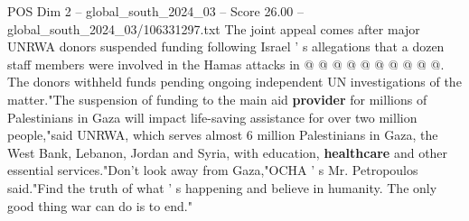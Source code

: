 \begin{textsample}{POS Dim 2 – global\_south\_2024\_03 – Score 26.00 – global\_south\_2024\_03/106331297.txt}
The joint appeal comes after major UNRWA donors suspended funding following Israel ' s allegations that a dozen staff members were involved in the Hamas attacks in @ @ @ @ @ @ @ @ @ @.
The donors withheld funds pending ongoing independent UN investigations of the matter."The suspension of funding to the main aid \textbf{provider} for millions of Palestinians in Gaza will impact life-saving assistance for over two million people,"said UNRWA, which serves almost 6 million Palestinians in Gaza, the West Bank, Lebanon, Jordan and Syria, with education, \textbf{healthcare} and other essential services."Don't look away from Gaza,"OCHA ' s Mr.
Petropoulos said."Find the truth of what ' s happening and believe in humanity.
The only good thing war can do is to end."

\end{textsample}
